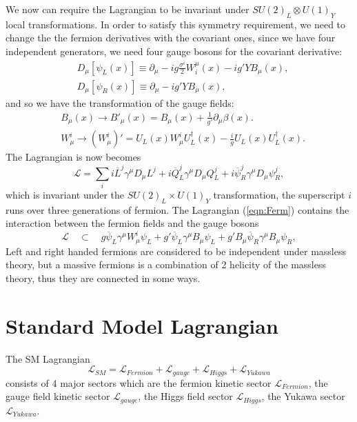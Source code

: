 \documentclass{report}
\numberwithin{equation}{section}
\begin{document}
We now can require the Lagrangian to be invariant under $SU(2)_L\otimes U(1)_Y$ local transformations. In order to satisfy this symmetry requirement, we need to change the the fermion derivatives with the covariant ones, since we have four independent generators, we need four gauge bosons for the covariant derivative:
\begin{align}\label{2}
&D_\mu[\psi_L(x)]\equiv \partial_\mu -ig\frac{\sigma^i}{2}W^\mu_i(x)- ig'YB_\mu(x),\\
&D_\mu[\psi_R(x)]\equiv \partial_\mu - ig'YB_\mu(x),
\end{align}
and so we have the transformation of the gauge fields:
\begin{align}
&B_\mu(x) \rightarrow B'_\mu(x) =B_\mu(x)+\frac{1}{g'}\partial_\mu \beta(x).\\
&W_\mu^i \rightarrow (W_\mu^{i})'=U_L(x)W_\mu^iU_L^\dagger(x)- \frac{i}{g}U_L(x) U_L^\dagger(x).
\end{align}
The Lagrangian is now becomes
\begin{equation}
\label{eqn:Ferm}
\mathcal{L}=\sum_i i\overline{L}^j\gamma^\mu D_\mu L^j + i\overline{Q}^j_L\gamma^\mu D_\mu Q^j_L + i\overline{\psi}^j_R\gamma^\mu D_\mu \psi^j_R,
\end{equation}
which is invariant under the $SU(2)_L\times U(1)_Y$ transformation,
the superscript $i$ runs over three generations of fermion.
The Lagrangian (\ref{eqn:Ferm}) contains the interaction between the fermion fields and the gauge bosons
\begin{equation}
\mathcal{L}\quad \subset \quad g\overline{\psi}_L \gamma^\mu W_\mu^i \psi_L +g'\overline{\psi}_L \gamma^\mu B_\mu \psi_L+ g'B_\mu \overline{\psi}_R\gamma^\mu B_\mu \psi_R,
\end{equation}
Left and right handed fermions are considered to be independent under massless theory, but a massive fermions is a combination of 2 helicity of the massless theory, thus they are connected in some ways.
\section{Standard Model Lagrangian}
The SM Lagrangian 
\begin{equation}
\mathcal{L}_{SM}=\mathcal{L}_{Fermion}+\mathcal{L}_{gauge}+\mathcal{L}_{Higgs}+\mathcal{L}_{Yukawa}
\end{equation}
consists of 4 major sectors which are the fermion kinetic sector $\mathcal{L}_{Fermion}$, the gauge field kinetic sector $\mathcal{L}_{gauge}$, the Higgs field sector $\mathcal{L}_{Higgs}$, the Yukawa sector $\mathcal{L}_{Yukawa}$.
\end{document}
